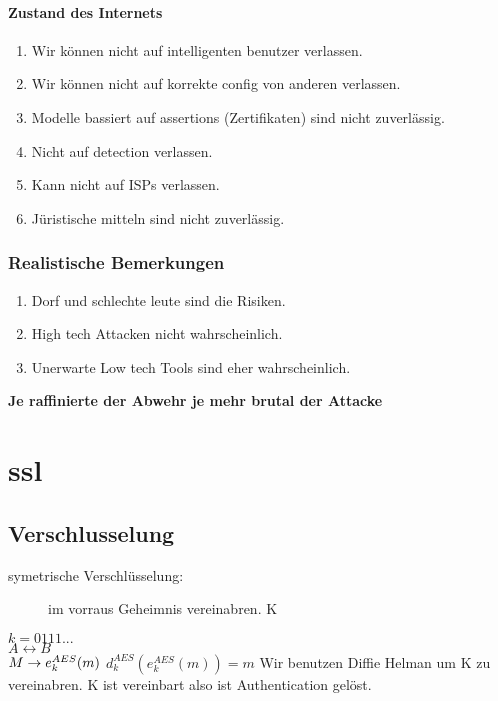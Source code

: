 \documentclass[a4paper,10pt]{scrreprt}
\begin{document}
\subsubsection{Zustand des Internets}
\begin{enumerate}
 \item Wir können nicht auf intelligenten benutzer verlassen.
 \item Wir können nicht auf korrekte config von anderen verlassen.
 \item Modelle bassiert auf assertions (Zertifikaten) sind nicht zuverlässig.
 \item Nicht auf detection verlassen.
 \item Kann nicht auf ISPs verlassen.
 \item Jüristische mitteln sind nicht zuverlässig. 
\end{enumerate}

\subsection{Realistische Bemerkungen}
\begin{enumerate}
 \item Dorf und schlechte leute sind die Risiken.
 \item High tech Attacken nicht wahrscheinlich.
 \item Unerwarte Low tech Tools sind eher wahrscheinlich.
 
\end{enumerate}

\textbf{Je raffinierte der Abwehr je mehr brutal der Attacke}
       

\chapter{ssl}
\section{Verschlusselung}
\begin{description}
 \item [symetrische Verschlüsselung:]im vorraus Geheimnis vereinabren. K
\end{description}

$ k = 0111... $\\
$ A \longleftrightarrow B $\\
$ M \rightarrow e_k^{AES}(m)\\$
$ d_k^{AES} (e_k^{AES}(m)) = m $
Wir benutzen Diffie Helman um K zu vereinabren.
K ist vereinbart also ist Authentication gelöst. 
\end{document}
